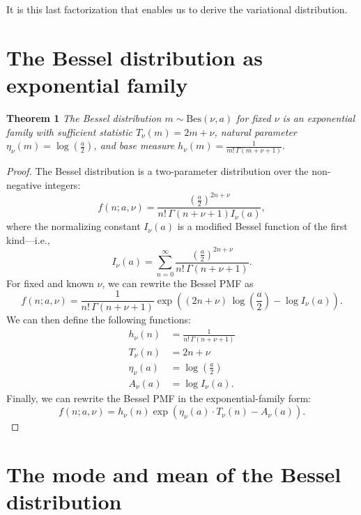 \documentclass[letterpaper]{article}
\newcommand{\teq}{\!=\!}
\newcommand{\tp}{\!+\!}
\begin{document}
  It is this last factorization that enables us to derive the variational
  distribution.
  
  \section{The Bessel distribution as exponential family}
  \label{sec:expfambessel}
  
  \textbf{Theorem 1}
    \label{theorem:expfam}
    \textit{The Bessel distribution $m \!\sim\!\textrm{Bes}(\nu, a)$ for fixed
   $\nu$ is an exponential family with sufficient statistic $T_\nu(m) \teq 2m
   \tp \nu$, natural parameter $\eta_\nu(m) \teq \log\left(\frac{a}{2}\right)$,
   and base measure $h_\nu(m) \teq \frac{1}{m!\,\Gamma(m+\nu+1)}$.}
  \begin{proof}
  The Bessel distribution \citep{yuan2000bessel} is a two-parameter distribution
  over the non-negative integers:
  \begin{equation}
  f(n; a, \nu) = \frac{\left(\frac{a}{2}\right)^{2n+\nu}}{n!\, \Gamma(n{+}\nu{+}1) I_\nu(a)},
  \end{equation}
  where the normalizing constant $I_\nu(a)$ is a modified Bessel function of the
  first kind---i.e.,
  \begin{equation}
  I_\nu(a) = \sum_{n=0}^\infty
  \frac{\left(\frac{a}{2}\right)^{2n+\nu}}{n!\, \Gamma(n{+}\nu{+}1)}.
  \end{equation}
  For fixed and known $\nu$, we can rewrite the Bessel PMF as
  \begin{equation}
    f(n; a, \nu) =
    \frac{1}{n!\,\Gamma(n{+}\nu{+}1)}\exp\left((2n{+}\nu)\,\log\left(\frac{a}{2}\right)
    -\log I_\nu(a)\right).
    \end{equation}
  We can then define the following functions:
  \begin{align}
  h_\nu(n) &= \frac{1}{n!\,\Gamma(n{+}\nu{+}1)} \\
  T_\nu(n) &= 2n+\nu\\
  \eta_\nu(a) &= \log\left(\frac{a}{2}\right) \\
  A_\nu(a) &= \log I_\nu(a).
  \end{align}
  Finally, we can rewrite the Bessel PMF in the exponential-family form:
  \begin{equation}
  f(n; a, \nu) = h_\nu(n) \exp{\left(\eta_\nu(a) \cdot T_\nu(n) -
  A_\nu(a)\right)}.
  \end{equation}
  \end{proof}
  
  \section{The mode and mean of the Bessel distribution}
  \label{sec:besselmode}
  
\end{document}
